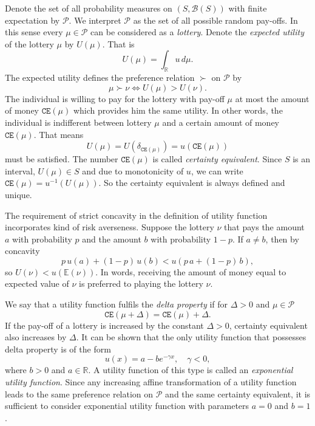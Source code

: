 Denote the set of all probability measures on $(S,\mathcal{B}(S))$ with finite expectation by $\mathcal{P}$. We interpret $\mathcal{P}$ as the set of all possible random pay-offs. In this sense every $\mu\in\mathcal{P}$ can be considered as a {\em lottery}. Denote the {\em expected utility} of the lottery $\mu$ by $U(\mu)$. That is
\[U(\mu)=\int_{\mathbb{R}} u\, d\mu.\]
The expected utility defines the preference relation $\succ$ on $\mathcal{P}$ by 
\[\mu\succ\nu\Leftrightarrow U(\mu)>U(\nu).\] 
The individual is willing to pay for the lottery with pay-off $\mu$ at most the amount of money $\texttt{CE}(\mu)$ which provides him the same utility. In other words, the individual is indifferent between lottery $\mu$ and a certain amount of money $\texttt{CE}(\mu)$. That means \[U(\mu)=U(\delta_{\texttt{CE}(\mu)})=u(\texttt{CE}(\mu))\]
 must be satisfied. The number $\texttt{CE}(\mu)$ is called {\em certainty equivalent}. Since $S$ is an interval, $U(\mu)\in S$ and due to monotonicity of $u$, we can write $\texttt{CE}(\mu)=u^{-1}(U(\mu))$. So the certainty equivalent is always defined and unique.

The requirement of strict concavity in the definition of utility function incorporates kind of risk averseness. Suppose the lottery $\nu$ that pays the amount $a$ with probability $p$ and the amount $b$ with probability $1-p$. If $a\neq b$, then by concavity 
\[p\,u(a)+(1-p)\,u(b)<u(p\,a+(1-p)\,b),\]
so $U(\nu)<u(\mathbb{E}(\nu))$. In words, receiving the amount of money equal to expected value of $\nu$ is preferred to playing the lottery $\nu$.

We say that a utility function fulfils the {\em delta property} if for $\Delta>0$ and $\mu\in\mathcal{P}$
\[\texttt{CE}(\mu + \Delta)=\texttt{CE}(\mu)+\Delta.\]
If the pay-off of a lottery is increased by the constant $\Delta>0$, certainty equivalent also increases by $\Delta$. It can be shown that the only utility function that possesses delta property is of the form
\begin{equation}
\label{expUF}
u(x)=a-b e^{-\gamma x}, \quad \gamma<0,
\end{equation}
where $b>0$ and $a\in\mathbb{R}$. A utility function of this type is called an {\em exponential utility function}. Since any increasing affine transformation of a utility function leads to the same preference relation on $\mathcal{P}$ and the same certainty equivalent, it is sufficient to consider exponential utility function with parameters $a=0$ and $b=1$.

